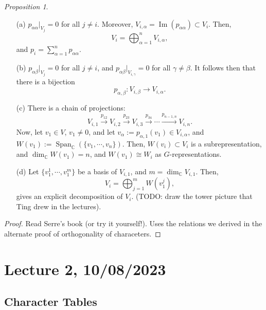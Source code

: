 \documentclass[a4paper]{report}
\theoremstyle{definition}
\theoremstyle{remark}
\theoremstyle{proposition}
\newtheorem{proposition}{Proposition}
\theoremstyle{conjecture}
\theoremstyle{lemma}
\theoremstyle{corollary}
\theoremstyle{exercise}
\theoremstyle{example}
\newcommand{\C}{\mathbb{C}}
\newcommand{\on}{\operatorname}
\begin{document}
\begin{proposition}
    \leavevmode 
    \begin{itemize}
        \item[(a)] $p_{\alpha\alpha}\vert_{V_j} = 0$ for all $j\neq i$.
            Moreover, $V_{i,\alpha} = \on{Im}(p_{\alpha\alpha}) \subset V_i$.
            Then, $$V_i = \bigoplus_{\alpha = 1}^n V_{i,\alpha},$$
            and $p_i = \sum_{\alpha=1}^np_{\alpha\alpha}$.
        \item[(b)] $p_{\alpha\beta}\vert_{V_j} = 0$ for all $j\neq i$,
            and $p_{\alpha\beta}\vert_{V_{i,\gamma}} = 0$ for all 
            $\gamma \neq \beta$. It follows then that there is a bijection
            $$p_{\alpha,\beta} : V_{i,\beta} \longrightarrow V_{i,\alpha}.$$
        \item[(c)] 
            There is a chain of projections:
            $$V_{i,1} \stackrel{p_{12}}{\longrightarrow} V_{i,2} \stackrel{p_{23}}{\longrightarrow} V_{i,3} \stackrel{p_{34}}{\longrightarrow} \cdots \stackrel{p_{n-1,n}}{\longrightarrow} V_{i,n}.$$
            Now, let $v_1 \in V$, $v_1\neq 0$, and let 
            $v_\alpha := p_{\alpha,1}(v_1) \in V_{i,\alpha}$, and 
            $W(v_1) := \on{Span}_\C(\lbrace v_1,\cdots,v_n\rbrace)$. Then,
            $W(v_i) \subset V_i$ is a subrepresentation, and $\dim_\C W(v_1)=n$,
            and $W(v_1) \cong W_i$ as $G$-representations.
        \item[(d)] Let $\lbrace v_1^1,\cdots, v_1^m\rbrace$ be a basis of 
            $V_{i,1}$, and $m = \dim_\C V_{i,1}$. Then,
            $$V_i = \bigoplus_{j=1}^m W(v_1^j),$$
            gives an explicit decomposition of $V_i$.
            (TODO: draw the tower picture that Ting drew in the lectures).
    \end{itemize}
\end{proposition}

\begin{proof}
    Read Serre's book (or try it yourself!). Uses the relations we derived 
    in the alternate proof of orthogonality of characeters.
\end{proof}

\section{Lecture 2, 10/08/2023}

\subsection{Character Tables}
\end{document}
